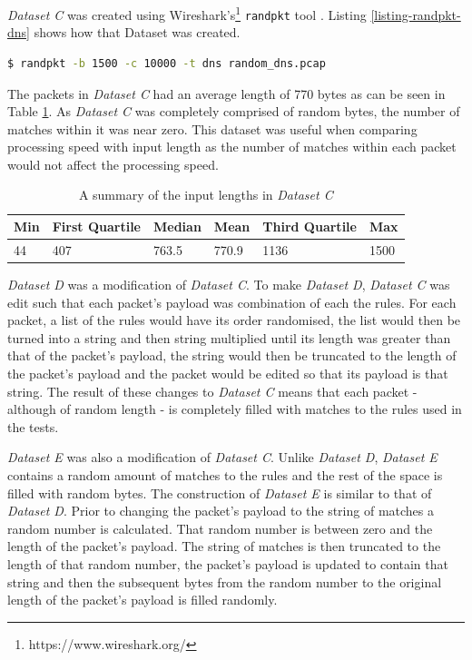 \documentclass[11pt]{article}
\begin{document}
\textit{Dataset C} was created using Wireshark's\footnote{https://www.wireshark.org/} \texttt{randpkt} tool \citep{randpkt2016}. Listing \ref{listing-randpkt-dns} shows how that Dataset was created.

\begin{lstlisting}[language = Bash, caption=Creating 10000 random DNS packets, label=listing-randpkt-dns]
$ randpkt -b 1500 -c 10000 -t dns random_dns.pcap
\end{lstlisting}

The packets in \textit{Dataset C} had an average length of 770 bytes as can be seen in Table \ref{table-datasetcinputlengthsummary}. As \textit{Dataset C} was completely comprised of random bytes, the number of matches within it was near zero. This dataset was useful when comparing processing speed with input length as the number of matches within each packet would not affect the processing speed.

\begin{table}[!htb]
\centering
\begin{tabular}{@{}llllll@{}}
\toprule
Min & First Quartile & Median & Mean & Third Quartile & Max \\ \midrule
44 & 407 & 763.5 & 770.9 & 1136 & 1500 \\ \bottomrule
\end{tabular}
\caption{A summary of the input lengths in \textit{Dataset C}}
\label{table-datasetcinputlengthsummary}
\end{table}

\textit{Dataset D} was a modification of \textit{Dataset C}. To make \textit{Dataset D}, \textit{Dataset C} was edit such that each packet's payload was combination of each the rules. For each packet, a list of the rules would have its order randomised, the list would then be turned into a string and then string multiplied until its length was greater than that of the packet's payload, the string would then be truncated to the length of the packet's payload and the packet would be edited so that its payload is that string. The result of these changes to \textit{Dataset C} means that each packet - although of random length - is completely filled with matches to the rules used in the tests.

\textit{Dataset E} was also a modification of \textit{Dataset C}. Unlike \textit{Dataset D}, \textit{Dataset E} contains a random amount of matches to the rules and the rest of the space is filled with random bytes. The construction of \textit{Dataset E} is similar to that of \textit{Dataset D}. Prior to changing the packet's payload to the string of matches a random number is calculated. That random number is between zero and the length of the packet's payload. The string of matches is then truncated to the length of that random number, the packet's payload is updated to contain that string and then the subsequent bytes from the random number to the original length of the packet's payload is filled randomly.
\end{document}
